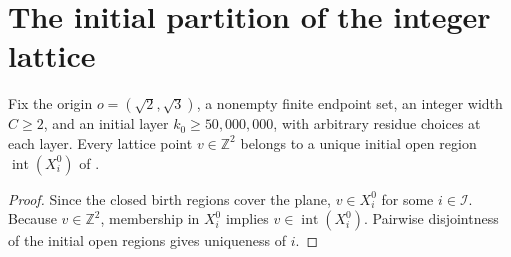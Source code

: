 \section{The initial partition of the integer lattice}
\label{sec:area_law_initial_lattice_partition}


\begin{lemma}
    \label{thm:area_law_initial_lattice_partition}
    \leanok
    Fix the origin $o=(\sqrt2,\sqrt3)$, a nonempty finite endpoint set,
    an integer width $C\ge 2$, and an initial layer $k_0\ge 50{,}000{,}000$,
    with arbitrary residue choices at each layer. Every lattice point
    $v\in\mathbb Z^2$ belongs to a unique initial open region
    $\operatorname{int}(X_i^0)$ of
    \cite[Section~11]{OpenAI2026AreaLaw}.
\end{lemma}
\begin{proof}\leanok
    Since the closed birth regions cover the plane, $v\in X_i^0$ for some
    $i\in\mathcal I$. Because $v\in\mathbb Z^2$, membership in $X_i^0$
    implies $v\in\operatorname{int}(X_i^0)$. Pairwise disjointness of the
    initial open regions gives uniqueness of $i$.
\end{proof}
